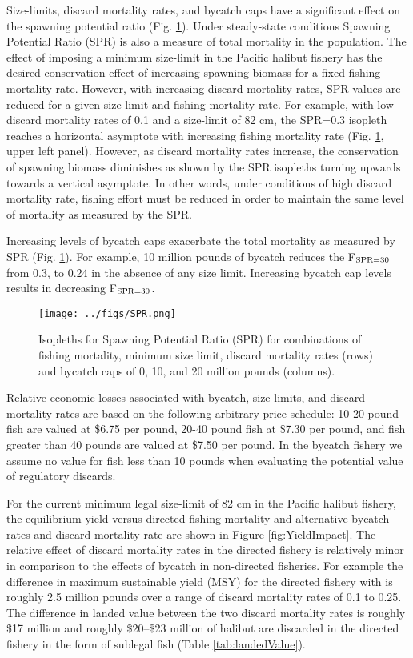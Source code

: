 \documentclass[12pt,leqno]{article}
\begin{document}
Size-limits, discard mortality rates, and bycatch caps have a significant effect on the spawning potential ratio (Fig. \ref{fig:SPR}). Under steady-state conditions Spawning Potential Ratio (SPR) is also a measure of total mortality in the population.  The effect of imposing a minimum size-limit in the Pacific halibut fishery has the desired conservation effect of increasing spawning biomass for a fixed fishing mortality rate.  However, with increasing discard mortality rates, SPR values are reduced for a given size-limit and fishing mortality rate.  For example, with low discard mortality rates of 0.1 and a size-limit of 82 cm, the SPR=0.3 isopleth reaches a horizontal asymptote with increasing fishing mortality rate (Fig. \ref{fig:SPR}, upper left panel). However, as discard mortality rates increase, the conservation of spawning biomass diminishes as shown by the SPR isopleths turning upwards towards a vertical asymptote.  In other words, under conditions of high discard mortality rate, fishing effort must be reduced in order to maintain the same level of mortality as measured by the SPR.

Increasing levels of bycatch caps exacerbate the total mortality as measured by SPR (Fig. \ref{fig:SPR}).  For example, 10 million pounds of bycatch reduces the F$_{\textnormal{SPR=30}}$ from 0.3, to 0.24 in the absence of any size limit.  Increasing bycatch cap levels results in decreasing F$_{\textnormal{SPR=30}}$.

\begin{figure}
	\texttt{[image: ../figs/SPR.png]}
	\caption{Isopleths for Spawning Potential Ratio (SPR) for combinations of fishing mortality, minimum size limit, discard mortality rates (rows) and bycatch caps of 0, 10, and 20 million pounds (columns).  }\label{fig:SPR}
\end{figure}

Relative economic losses associated with bycatch, size-limits, and discard mortality rates are based on the following arbitrary price schedule: 10-20 pound fish are valued at \$6.75 per pound, 20-40 pound fish at \$7.30 per pound, and fish greater than 40 pounds are valued at \$7.50 per pound.  In the bycatch fishery we assume no value for fish less than 10 pounds when evaluating the potential value of regulatory discards.

For the current minimum legal size-limit of 82 cm in the Pacific halibut fishery, the equilibrium yield versus directed fishing mortality and alternative bycatch rates and discard mortality rate are shown in Figure \ref{fig:YieldImpact}.  The relative effect of discard mortality rates in the directed fishery is relatively minor in comparison to the effects of bycatch in non-directed fisheries.  For example the difference in maximum sustainable yield (MSY) for the directed fishery with is roughly 2.5 million pounds over a range of discard mortality rates of 0.1 to 0.25.  The difference in landed value between the two discard mortality rates is roughly \$17 million and roughly \$20--\$23 million of halibut are discarded in the directed fishery in the form of sublegal fish  (Table \ref{tab:landedValue}).
\end{document}
